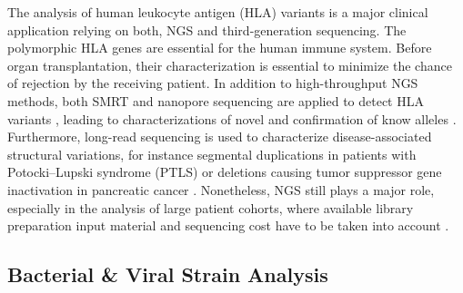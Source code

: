 The analysis of human leukocyte antigen (HLA) variants is a major clinical application relying on both, NGS and third-generation sequencing.
The polymorphic HLA genes are essential for the human immune system. 
Before organ transplantation, their characterization is essential to minimize the chance of rejection by the receiving patient.
In addition to high-throughput NGS methods, both SMRT and nanopore sequencing are applied to detect HLA variants \cite{Cereb2015, Ammar2015}, leading to characterizations of novel and confirmation of know alleles \cite{Albrecht2017}.
%
%
%
Furthermore, long-read sequencing is used to characterize disease-associated structural variations, for instance segmental duplications in patients with Potocki–Lupski syndrome (PTLS) \cite{Wang2015} or deletions causing tumor suppressor gene inactivation in pancreatic cancer \cite{Norris2016}.
Nonetheless, NGS still plays a major role, especially in the analysis of large patient cohorts, where available library preparation input material and sequencing cost have to be taken into account \cite{Tang2017}.




\subsection{Bacterial \& Viral Strain Analysis}
\label{subsec:state_of_art:strain}


